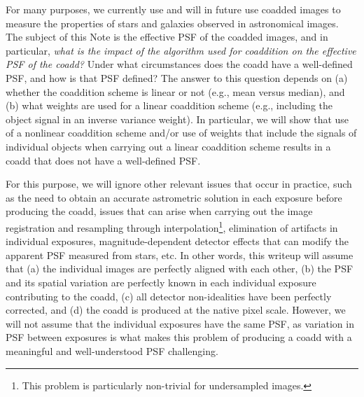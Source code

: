 \documentclass[modern]{style_and_logos/lsstdescnote}
\begin{document}
For many purposes, we currently use and will in future use coadded images to measure the properties of stars and galaxies observed in astronomical images.  The subject of this Note is the effective PSF of the coadded images, and in particular, {\em what is the impact of the algorithm used for coaddition on the effective PSF of the coadd?} Under what circumstances does the coadd have a well-defined PSF, and how is that PSF defined?  The answer to this question depends on (a) whether the coaddition scheme is linear or not (e.g., mean versus median), and (b) what weights are used for a linear coaddition scheme (e.g., including the object signal in an inverse variance weight). In particular, we will show that use of a nonlinear coaddition scheme and/or use of weights that include the signals of individual objects when carrying out a linear coaddition scheme results in a coadd that does not have a well-defined PSF.

For this purpose, we will ignore other relevant issues that occur in practice, such as the need to obtain an accurate astrometric solution in each exposure before producing the coadd, issues that can arise when carrying out the image registration and resampling through interpolation\footnote{This problem is particularly non-trivial for undersampled images.}, elimination of artifacts in individual exposures, magnitude-dependent detector effects that can modify the apparent PSF measured from stars, etc.  In other words, this writeup will assume that (a) the individual images are perfectly aligned with each other, (b) the PSF and its spatial variation are perfectly known in each individual exposure contributing to the coadd, (c) all detector non-idealities have been perfectly corrected, and (d) the coadd is produced at the native pixel scale. 
However, we will not assume that the individual exposures have the same PSF, as variation in PSF between exposures is what makes this problem of producing a coadd with a meaningful and well-understood PSF challenging. 
\end{document}
